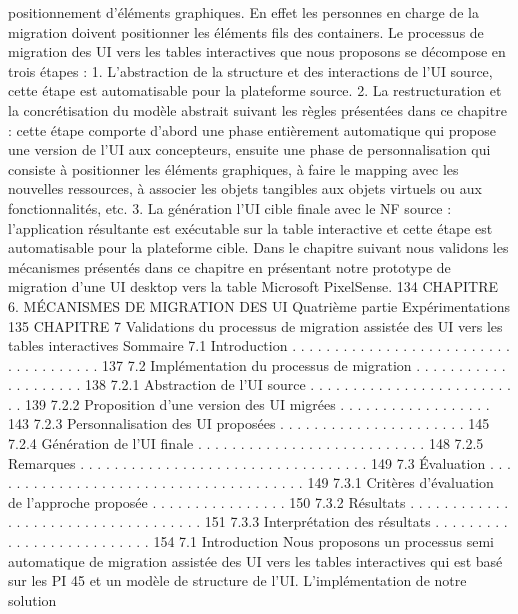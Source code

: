 \documentclass{article}
\begin{document}
positionnement d’\'{e}l\'{e}ments graphiques. En effet les personnes en charge de la migration doivent positionner les \'{e}l\'{e}ments ﬁls des containers.
Le processus de migration des UI vers les tables interactives que nous proposons se d\'{e}compose
en trois \'{e}tapes :
1. L’abstraction de la structure et des interactions de l’UI source, cette \'{e}tape est automatisable
pour la plateforme source.
2. La restructuration et la concr\'{e}tisation du mod\`{e}le abstrait suivant les r\`{e}gles pr\'{e}sent\'{e}es dans ce
chapitre : cette \'{e}tape comporte d’abord une phase enti\`{e}rement automatique qui propose une version de l’UI aux concepteurs, ensuite une phase de personnalisation qui consiste \`{a} positionner
les \'{e}l\'{e}ments graphiques, \`{a} faire le mapping avec les nouvelles ressources, \`{a} associer les objets
tangibles aux objets virtuels ou aux fonctionnalit\'{e}s, etc.
3. La g\'{e}n\'{e}ration l’UI cible ﬁnale avec le NF source : l’application r\'{e}sultante est ex\'{e}cutable sur la
table interactive et cette \'{e}tape est automatisable pour la plateforme cible.
Dans le chapitre suivant nous validons les m\'{e}canismes pr\'{e}sent\'{e}s dans ce chapitre en pr\'{e}sentant
notre prototype de migration d’une UI desktop vers la table Microsoft PixelSense.
134
CHAPITRE 6. MÉCANISMES DE MIGRATION DES UI
Quatri\`{e}me partie
Exp\'{e}rimentations
135
CHAPITRE 7
Validations du processus de migration
assist\'{e}e des UI vers les tables interactives
Sommaire
7.1
Introduction . . . . . . . . . . . . . . . . . . . . . . . . . . . . . . . . . . . . . 137
7.2
Impl\'{e}mentation du processus de migration . . . . . . . . . . . . . . . . . . . . 138
7.2.1
Abstraction de l’UI source . . . . . . . . . . . . . . . . . . . . . . . . . . 139
7.2.2
Proposition d’une version des UI migr\'{e}es . . . . . . . . . . . . . . . . . . 143
7.2.3
Personnalisation des UI propos\'{e}es . . . . . . . . . . . . . . . . . . . . . . 145
7.2.4
G\'{e}n\'{e}ration de l’UI ﬁnale . . . . . . . . . . . . . . . . . . . . . . . . . . . 148
7.2.5
Remarques . . . . . . . . . . . . . . . . . . . . . . . . . . . . . . . . . . 149
7.3
Évaluation . . . . . . . . . . . . . . . . . . . . . . . . . . . . . . . . . . . . . . 149
7.3.1
Crit\`{e}res d’\'{e}valuation de l’approche propos\'{e}e . . . . . . . . . . . . . . . . 150
7.3.2
R\'{e}sultats
. . . . . . . . . . . . . . . . . . . . . . . . . . . . . . . . . . . 151
7.3.3
Interpr\'{e}tation des r\'{e}sultats . . . . . . . . . . . . . . . . . . . . . . . . . . 154
7.1
Introduction
Nous proposons un processus semi automatique de migration assist\'{e}e des UI vers les tables interactives qui est bas\'{e} sur les PI 45 et un mod\`{e}le de structure de l’UI. L’impl\'{e}mentation de notre solution
\end{document}
